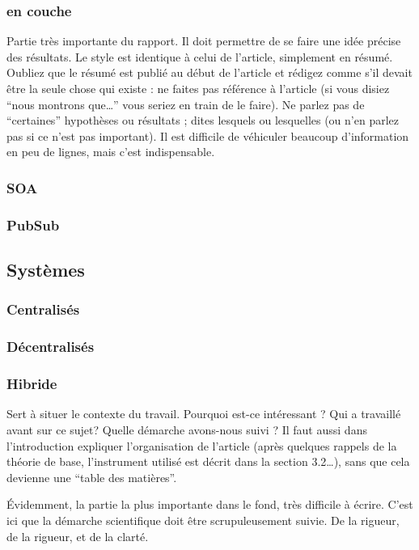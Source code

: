 \documentclass{ipgpmaster}
\begin{document}
\subsubsection{en couche}
Partie très importante du rapport.
Il doit permettre de se faire une idée précise des résultats.
Le style est identique à celui de l'article, simplement en résumé.
Oubliez que le résumé est publié au début de l'article et rédigez 
comme s'il devait être la seule chose qui existe : ne faites pas 
référence à l'article (si vous disiez ``nous montrons que\dots'' 
vous seriez en train de le faire). 
Ne parlez pas de ``certaines'' hypothèses ou résultats ; dites lesquels 
ou lesquelles (ou n'en parlez pas si ce n'est pas important). Il est difficile de véhiculer beaucoup 
d'information en peu de lignes, mais c'est indispensable.
\subsubsection{SOA}
\subsubsection{PubSub}

\subsection{Systèmes}
\subsubsection{Centralisés}
\subsubsection{Décentralisés}
\subsubsection{Hibride}

Sert à situer le contexte du travail. Pourquoi est-ce intéressant ? 
Qui a travaillé avant sur ce sujet? Quelle démarche avons-nous suivi ?
Il faut aussi dans l'introduction expliquer l'organisation de l'article 
(après quelques rappels de la théorie de base,  l'instrument 
utilisé est décrit dans la section 3.2\dots), sans que cela 
devienne une ``table des matières''.




Évidemment, la partie la plus importante dans le fond, très difficile 
à écrire. C'est ici que la démarche scientifique doit être 
scrupuleusement suivie. De la rigueur, de la rigueur, et de la clarté.
\end{document}
